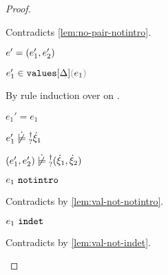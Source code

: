 \begin{proof}
\begin{byCases}
\begin{byCases}
\begin{byCases}
\begin{byCases}
\begin{byCases}
\begin{pfsteps*}
            \end{pfsteps*}
            Contradicts \autoref{lem:no-pair-notintro}.
            \item[\text{(\ref{rule:IVPair})}]
            \begin{pfsteps*}
            \item $e'=(e_1' , e_2')$ 
            \item $\inValues{e_1'}{\Delta}{e_1}$  
            \end{pfsteps*}
            By rule induction over  on .
            \begin{byCases}
              \item[\text{(\ref{rule:IVVal})}]
              \begin{pfsteps*}
              \item $e_1'=e_1$  
              \item $\cnotsatisfyormay{e_1'}{\hxi_1}$  
              \item $\cnotsatisfyormay{\hpair{e_1'}{e_2'}}{\cpair{\hxi_1}{\hxi_2}}$ 
              \end{pfsteps*} 
              \item[\text{(\ref{rule:IVIndet})}]
              \begin{pfsteps*}
              \item $e_1 ~\mathtt{notintro}$ 
              \end{pfsteps*} 
              Contradicts  by \autoref{lem:val-not-notintro}.
              \item[\text{(\ref{rule:IVInl}), (\ref{rule:IVInr}), (\ref{rule:IVPair})}]
              \begin{pfsteps*}
              \item $e_1 ~\mathtt{indet}$ 
              \end{pfsteps*} 
              Contradicts  by \autoref{lem:val-not-indet}.
            \end{byCases}
          \end{byCases}
          \item[\cnotsatisfyormay{e_2}{\hxi_2}]

\end{byCases}
\end{byCases}
\end{byCases}
\end{byCases}
\end{proof}
